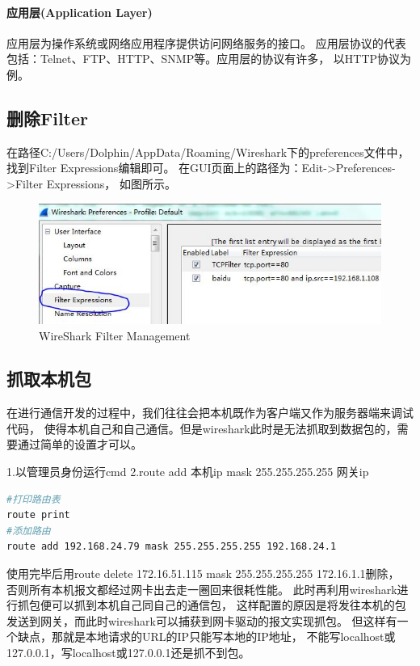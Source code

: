 \documentclass{book}
\begin{document}
\paragraph{应用层(Application Layer)}应用层为操作系统或网络应用程序提供访问网络服务的接口。
应用层协议的代表包括：Telnet、FTP、HTTP、SNMP等。应用层的协议有许多，
以HTTP协议为例。

\subsection{删除Filter}

在路径C:/Users/Dolphin/AppData/Roaming/Wireshark下的preferences文件中，
找到Filter Expressions编辑即可。
在GUI页面上的路径为：Edit->Preferences->Filter Expressions，
如图所示。

\begin{figure}[htbp]
	\centering
	\includegraphics[scale=0.6]{WireSharkFilterManagement.jpg}
	\caption{WireShark Filter Management}
	\label{fig:WireSharkFilterManagement}
\end{figure}

\subsection{抓取本机包}

在进行通信开发的过程中，我们往往会把本机既作为客户端又作为服务器端来调试代码，
使得本机自己和自己通信。但是wireshark此时是无法抓取到数据包的，需要通过简单的设置才可以。

1.以管理员身份运行cmd
2.route add 本机ip mask 255.255.255.255 网关ip

\begin{lstlisting}[language=Bash]
#打印路由表
route print
#添加路由
route add 192.168.24.79 mask 255.255.255.255 192.168.24.1
\end{lstlisting}

使用完毕后用route delete 172.16.51.115 mask 255.255.255.255 172.16.1.1删除，
否则所有本机报文都经过网卡出去走一圈回来很耗性能。
此时再利用wireshark进行抓包便可以抓到本机自己同自己的通信包，
这样配置的原因是将发往本机的包发送到网关，而此时wireshark可以捕获到网卡驱动的报文实现抓包。
但这样有一个缺点，那就是本地请求的URL的IP只能写本地的IP地址，
不能写localhost或127.0.0.1，写localhost或127.0.0.1还是抓不到包。
\end{document}
